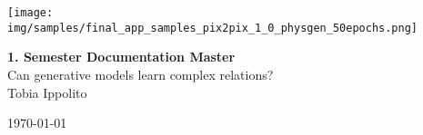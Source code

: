\documentclass[fontsize=11pt, paper=a4, pagesize=auto]{scrreprt}
\begin{document}
\begin{titlepage}
	\centering
	\vspace*{0cm}
	
	\texttt{[image: img/samples/final\_app\_samples\_pix2pix\_1\_0\_physgen\_50epochs.png]}
	
	\vspace{2cm}
	{\Huge \textbf{1. Semester Documentation Master}}\\[0.5cm]
	{\Large Can generative models learn complex relations?}\\[2cm]
	
	{\large Tobia Ippolito}
	
	\vfill
	{\large \today}
\end{titlepage}
\tableofcontents

\cleardoublepage
{}







{}
\begin{flushleft}
	\printbibliography[heading=bibintoc]
\end{flushleft}

%
\end{document}
